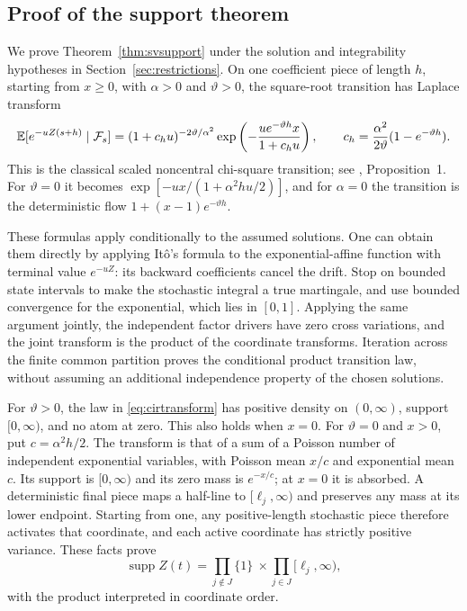 
\subsection{Proof of the support theorem}
We prove Theorem~\ref{thm:svsupport} under the solution and integrability hypotheses in Section~\ref{sec:restrictions}. On one coefficient piece of length $h$, starting from $x\geq0$, with $\alpha>0$ and $\vartheta>0$, the square-root transition has Laplace transform
\begin{equation}\label{eq:cirtransform}
\mathbb E[e^{-uZ(s+h)}\mid\mathcal F_s]
=(1+c_hu)^{-2\vartheta/\alpha^2}
 \exp\left(-\frac{u e^{-\vartheta h}x}{1+c_hu}\right),
\qquad c_h=\frac{\alpha^2}{2\vartheta}(1-e^{-\vartheta h}).
\end{equation}
This is the classical scaled noncentral chi-square transition; see \citet{malham2008square}, Proposition~1. For $\vartheta=0$ it becomes
$\exp[-ux/(1+\alpha^2hu/2)]$, and for $\alpha=0$ the transition is the deterministic flow $1+(x-1)e^{-\vartheta h}$.

These formulas apply conditionally to the assumed solutions. One can obtain them directly by applying Itô's formula to the exponential-affine function with terminal value $e^{-uZ}$: its backward coefficients cancel the drift. Stop on bounded state intervals to make the stochastic integral a true martingale, and use bounded convergence for the exponential, which lies in $[0,1]$. Applying the same argument jointly, the independent factor drivers have zero cross variations, and the joint transform is the product of the coordinate transforms. Iteration across the finite common partition proves the conditional product transition law, without assuming an additional independence property of the chosen solutions.

For $\vartheta>0$, the law in \eqref{eq:cirtransform} has positive density on $(0,\infty)$, support $[0,\infty)$, and no atom at zero. This also holds when $x=0$. For $\vartheta=0$ and $x>0$, put $c=\alpha^2h/2$. The transform is that of a sum of a Poisson number of independent exponential variables, with Poisson mean $x/c$ and exponential mean $c$. Its support is $[0,\infty)$ and its zero mass is $e^{-x/c}$; at $x=0$ it is absorbed. A deterministic final piece maps a half-line to $[\ell_j,\infty)$ and preserves any mass at its lower endpoint. Starting from one, any positive-length stochastic piece therefore activates that coordinate, and each active coordinate has strictly positive variance. These facts prove
\[
\operatorname{supp}Z(t)=
 \prod_{j\notin J}\{1\}\ \times\prod_{j\in J}[\ell_j,\infty),
\]
with the product interpreted in coordinate order.

